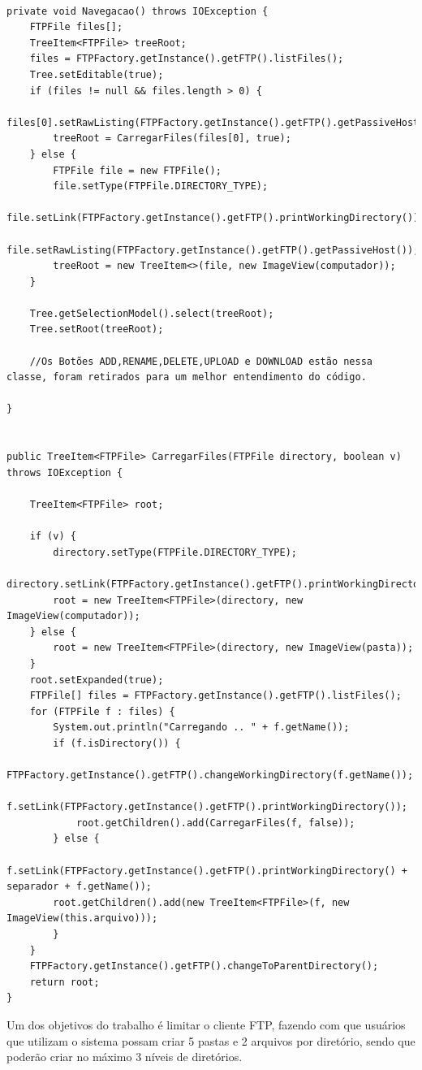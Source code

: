 \documentclass[12pt]{article}
\begin{document}
\begin{lstlisting}

private void Navegacao() throws IOException {
	FTPFile files[];
	TreeItem<FTPFile> treeRoot;
	files = FTPFactory.getInstance().getFTP().listFiles();
	Tree.setEditable(true);
	if (files != null && files.length > 0) {
		files[0].setRawListing(FTPFactory.getInstance().getFTP().getPassiveHost());
		treeRoot = CarregarFiles(files[0], true);
	} else {
		FTPFile file = new FTPFile();
		file.setType(FTPFile.DIRECTORY_TYPE);
		file.setLink(FTPFactory.getInstance().getFTP().printWorkingDirectory());
		file.setRawListing(FTPFactory.getInstance().getFTP().getPassiveHost());
		treeRoot = new TreeItem<>(file, new ImageView(computador));
	}
	
	Tree.getSelectionModel().select(treeRoot);	
	Tree.setRoot(treeRoot);
	
	//Os Botões ADD,RENAME,DELETE,UPLOAD e DOWNLOAD estão nessa classe, foram retirados para um melhor entendimento do código.

}


public TreeItem<FTPFile> CarregarFiles(FTPFile directory, boolean v) throws IOException {
	
	TreeItem<FTPFile> root;

	if (v) {
		directory.setType(FTPFile.DIRECTORY_TYPE);
		directory.setLink(FTPFactory.getInstance().getFTP().printWorkingDirectory());
		root = new TreeItem<FTPFile>(directory, new ImageView(computador));
    } else {
		root = new TreeItem<FTPFile>(directory, new ImageView(pasta));
	}
	root.setExpanded(true);
	FTPFile[] files = FTPFactory.getInstance().getFTP().listFiles();
	for (FTPFile f : files) {
		System.out.println("Carregando .. " + f.getName());
	    if (f.isDirectory()) {
			FTPFactory.getInstance().getFTP().changeWorkingDirectory(f.getName());
			f.setLink(FTPFactory.getInstance().getFTP().printWorkingDirectory());
			root.getChildren().add(CarregarFiles(f, false));
		} else {
		f.setLink(FTPFactory.getInstance().getFTP().printWorkingDirectory() + separador + f.getName());
		root.getChildren().add(new TreeItem<FTPFile>(f, new ImageView(this.arquivo)));
		}
	}
	FTPFactory.getInstance().getFTP().changeToParentDirectory(); 
	return root;
}

\end{lstlisting}

Um dos objetivos do trabalho é limitar o cliente FTP, fazendo com que usuários que utilizam o sistema possam criar 5 pastas e 2 arquivos por diretório, sendo que poderão criar no máximo 3 níveis de diretórios.
\end{document}
